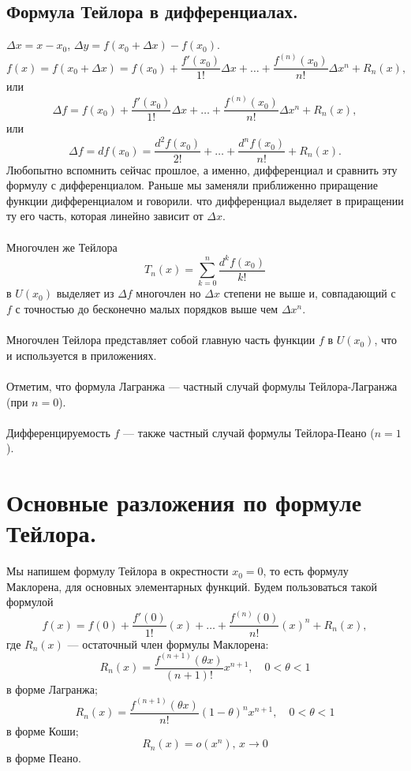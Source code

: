 	\subsection{Формула Тейлора в дифференциалах.}
	$\Delta x=x-x_0$, $\Delta y=f(x_0+ \Delta x)-f(x_0)$.
	$$f(x)=f(x_0+\Delta x)=f(x_0)+\frac{f'(x_0)}{1!}\Delta x+\ldots+\frac{f^{(n)}(x_0)}{n!}\Delta x^n+R_n(x),$$
	или $$\Delta f=f(x_0)+\frac{f'(x_0)}{1!}\Delta x+\ldots+\frac{f^{(n)}(x_0)}{n!}\Delta x^n+R_n(x),$$
	или $$\Delta f=df(x_0)=\frac{d^2f(x_0)}{2!}+\ldots+\frac{d^nf(x_0)}{n!}+R_n(x).$$
	Любопытно вспомнить сейчас прошлое, а именно, дифференциал и сравнить эту формулу с дифференциалом. Раньше мы заменяли приближенно приращение функции дифференциалом и говорили. что дифференциал выделяет в приращении ту его часть, которая линейно зависит от $\Delta x.$\\\\
	Многочлен же Тейлора $$T_n(x)=\sum_{k=0}^n \frac{d^k f(x_0)}{k!}$$  в $U(x_0)$
	выделяет из $\Delta f$ многочлен но $\Delta x$ степени не выше и, совпадающий с $f$ с точностью до
	бесконечно малых порядков выше чем $\Delta x^n$.\\\\
	Многочлен Тейлора представляет собой главную часть функции $f$ в $U(x_0)$, что и используется в приложениях.\\\\
	Отметим, что формула Лагранжа --- частный случай формулы Тейлора-Лагранжа (при $n=0$).\\\\
	Дифференцируемость $f$ --- также частный случай формулы Тейлора-Пеано ($n=1$).
	\section{Основные разложения по формуле Тейлора.}
	Мы напишем формулу Тейлора в окрестности $x_0=0$, то есть формулу Маклорена, для основных элементарных функций. Будем пользоваться такой формулой
	$$f(x)=f(0)+\frac{f'(0)}{1!}(x)+\dots+\frac{f^{(n)}(0)}{n!}(x)^n+R_n(x),$$ где $R_n(x)$ --- остаточный член формулы Маклорена:
	$$R_n(x)=\frac{f^{(n+1)}(\theta x)}{(n+1)!}x^{n+1},\quad 0<\theta<1$$ в форме Лагранжа;\\
	$$R_n(x)=\frac{f^{(n+1)}(\theta x)}{n!}(1-\theta)^n x^{n+1},\quad 0<\theta<1$$ в форме Коши;\\
	$$R_n(x)=o(x^n), \, x \to 0$$ в форме Пеано.
